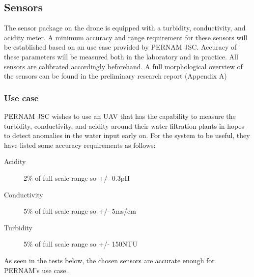 
\subsection{Sensors}

The sensor package on the drone is equipped with a turbidity, conductivity, and acidity meter. A minimum accuracy and range requirement for these sensors will be established based on an use case provided by PERNAM \gls{JSC}. Accuracy of these parameters will be measured both in the laboratory and in practice. All sensors are calibrated accordingly beforehand. A full morphological overview of the sensors can be found in the preliminary research report (Appendix A)

\subsubsection{Use case} \label{sensors:usecase}

PERNAM \gls{JSC} wishes to use an \gls{UAV} that has the capability to measure the turbidity, conductivity, and acidity around their water filtration plants in hopes to detect anomalies in the water input early on. For the system to be useful, they have listed some accuracy requirements as follows:

\begin{description}
   \item[Acidity] 2\% of full scale range so +/- 0.3pH
   \item[Conductivity] 5\% of full scale range so +/- 5ms/cm
   \item[Turbidity] 5\% of full scale range so +/- 150NTU
\end{description}

As seen in the tests below, the chosen sensors are accurate enough for PERNAM's use case.



